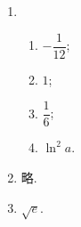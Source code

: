% 
\begin{enumerate}
    \item %
        \begin{enumerate}[(1)]
            \item %
                $-\dfrac{1}{12}$;
            \item %
                $1$;
            \item %
                $\dfrac16$;
            \item %
                $\ln^2a$.
        \end{enumerate}
    \item %
        略.
    \item %
        $\sqrt{e}$.
\end{enumerate}
% 